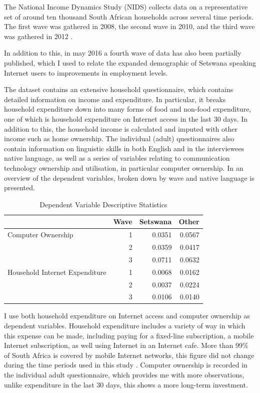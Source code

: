 \documentclass[a4paper,british]{article}\usepackage[]{graphicx}\usepackage[]{xcolor}
\providecommand{\tabularnewline}{\\}
\begin{document}
\label{sec:data}The National Income Dynamics Study (NIDS) collects
data on a representative set of around ten thousand South African
households across several time periods. The first wave was gathered
in 2008, the second wave in 2010, and the third wave was gathered
in 2012 \citep{saldru2008nids,saldru2012nids,saldru2013nids}.

In addition to this, in may 2016 a fourth wave of data has also been
partially published, which I used to relate the expanded demographic
of Setswana speaking Internet users to improvements in employment
levels.

The dataset contains an extensive household questionnaire, which contains
detailed information on income and expenditure. In particular, it
breaks household expenditure down into many forms of food and non-food
expenditure, one of which is household expenditure on Internet access
in the last 30 days. In addition to this, the household income is
calculated and imputed with other income such as home ownership. The
individual (adult) questionnaires also contain information on linguistic
skills in both English and in the interviewees native language, as
well as a series of variables relating to communication technology
ownership and utilisation, in particular computer ownership. In 
an overview of the dependent variables, broken down by wave and native
language is presented.



\begin{table}[H]

\caption{Dependent Variable Descriptive Statistics}

\begin{centering}
\begin{tabular}{|l|r|r|r|}
\hline 
 &
Wave &
Setswana &
Other\tabularnewline
\hline 
\hline 
Computer Ownership &
1 &
0.0351 &
0.0567\tabularnewline
\hline 
 &
2 &
0.0359 &
0.0417\tabularnewline
\hline 
 &
3 &
0.0711 &
0.0632\tabularnewline
\hline 
Household Internet Expenditure &
1 &
0.0068 &
0.0162\tabularnewline
\hline 
 &
2 &
0.0037 &
0.0224\tabularnewline
\hline 
 &
3 &
0.0106 &
0.0140\tabularnewline
\hline 
\end{tabular}
\par\end{centering}
\end{table}

I use both household expenditure on Internet access and computer ownership
as dependent variables. Household expenditure includes a variety of
way in which this expense can be made, including paying for a fixed-line
subscription, a mobile Internet subscription, as well using Internet
in an Internet cafe. More than 99\% of South Africa is covered by
mobile Internet networks, this figure did not change during the time
periods used in this study \citep{international2015world}. Computer
ownership is recorded in the individual adult questionnaire, which
provides me with more observations, unlike expenditure in the last
30 days, this shows a more long-term investment.
\end{document}
